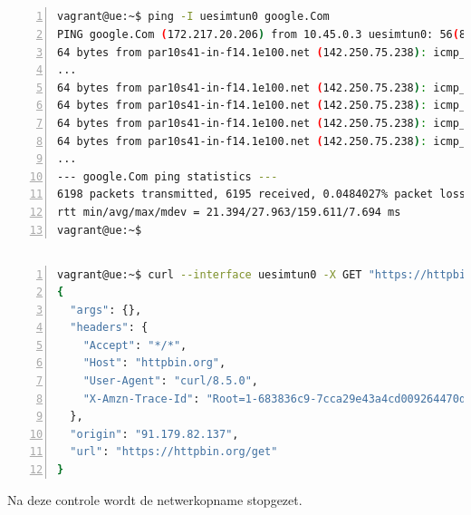 \subsection{}%
\label{sec:Test-ping}%

\begin{lstlisting}[basicstyle=\small, frame=single, breaklines=true, postbreak=\mbox{\textcolor{red}{$\hookrightarrow$}\space}, escapeinside ={\%,}, escapechar={!}, numbers=left, language=sh, caption=Test - Ping]
    vagrant@ue:~$ ping -I uesimtun0 google.Com
PING google.Com (172.217.20.206) from 10.45.0.3 uesimtun0: 56(84) bytes of data.
64 bytes from par10s41-in-f14.1e100.net (142.250.75.238): icmp_seq=6182 ttl=116 time=25.1 ms
...
64 bytes from par10s41-in-f14.1e100.net (142.250.75.238): icmp_seq=6183 ttl=116 time=41.6 ms
64 bytes from par10s41-in-f14.1e100.net (142.250.75.238): icmp_seq=6184 ttl=116 time=30.3 ms
64 bytes from par10s41-in-f14.1e100.net (142.250.75.238): icmp_seq=6185 ttl=116 time=38.5 ms
64 bytes from par10s41-in-f14.1e100.net (142.250.75.238): icmp_seq=6186 ttl=116 time=23.5 ms
...
--- google.Com ping statistics ---
6198 packets transmitted, 6195 received, 0.0484027% packet loss, time 6231019ms
rtt min/avg/max/mdev = 21.394/27.963/159.611/7.694 ms
vagrant@ue:~$
\end{lstlisting}

\subsection{}%
\label{sec:Test-curl}%


\begin{lstlisting}[basicstyle=\small, frame=single, breaklines=true, postbreak=\mbox{\textcolor{red}{$\hookrightarrow$}\space}, escapeinside ={\%,}, escapechar={!}, numbers=left, language=sh, caption=Test - Curl]
vagrant@ue:~$ curl --interface uesimtun0 -X GET "https://httpbin.org/get"
{
  "args": {},
  "headers": {
    "Accept": "*/*",
    "Host": "httpbin.org",
    "User-Agent": "curl/8.5.0",
    "X-Amzn-Trace-Id": "Root=1-683836c9-7cca29e43a4cd009264470d9"
  },
  "origin": "91.179.82.137",
  "url": "https://httpbin.org/get"
}
\end{lstlisting}

Na deze controle wordt de netwerkopname stopgezet.

\section{}%
\label{sec:integrations}%


